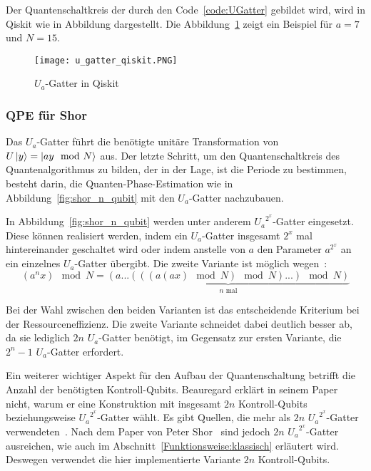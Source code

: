 Der Quantenschaltkreis der durch den Code~\ref{code:UGatter} gebildet wird, 
wird in Qiskit wie in Abbildung dargestellt. 
Die Abbildung~\ref{fig:u_gatter_qiskit} zeigt ein Beispiel für \(a=7\) und \(N=15\).

\begin{figure} [H]
  \caption{\(U_a\)-Gatter in Qiskit}
  \label{fig:u_gatter_qiskit}
  \texttt{[image: u\_gatter\_qiskit.PNG]}
  \centering
  \end{figure}

\subsubsection{QPE für Shor}
Das \(U_a\)-Gatter führt die benötigte unitäre Transformation von \(U\ket{y} = \ket{ay \mod N}\) aus.
Der letzte Schritt, um den Quantenschaltkreis des Quantenalgorithmus zu bilden, 
der in der Lage, ist die Periode zu bestimmen, 
besteht darin, 
die Quanten-Phase-Estimation wie in Abbildung~\ref{fig:shor_n_qubit} mit den \(U_a\)-Gatter nachzubauen.

In Abbildung~\ref{fig:shor_n_qubit} werden unter anderem \({U_a}^{2^x}\)-Gatter eingesetzt.
Diese können realisiert werden, 
indem ein \({U_a}\)-Gatter insgesamt \(2^x\) mal hintereinander geschaltet wird oder 
indem anstelle von \(a\) den Parameter \(a^{2^x}\) an ein einzelnes \(U_a\)-Gatter übergibt.
Die zweite Variante ist möglich wegen~\cite{beauregard2003circuit}:
\[(a^nx)\mod N = \underbrace{(a...(((a(ax)\mod N)\mod N)...)\mod N)}_{\text{\(n\) mal}}\]

Bei der Wahl zwischen den beiden Varianten ist das entscheidende Kriterium bei der Ressourceneffizienz. 
Die zweite Variante schneidet dabei deutlich besser ab, da sie lediglich \(2n\) \(U_a\)-Gatter benötigt, 
im Gegensatz zur ersten Variante, die \(2^n-1\) \(U_a\)-Gatter erfordert.

Ein weiterer wichtiger Aspekt für den Aufbau der Quantenschaltung betrifft die Anzahl der benötigten Kontroll-Qubits.
Beauregard erklärt in seinem Paper~\cite{beauregard2003circuit} nicht, 
warum er eine Konstruktion mit insgesamt \(2n\) Kontroll-Qubits beziehungsweise \({U_a}^{2^x}\)-Gatter wählt.
Es gibt Quellen, die mehr als \(2n\) \({U_a}^{2^x}\)-Gatter verwendeten~\cite{nielsen_chuang_2010}.
Nach dem Paper von Peter Shor~\cite{Shor_1997} sind jedoch \(2n\) \({U_a}^{2^x}\)-Gatter ausreichen,
wie auch im Abschnitt~\ref{Funktionsweise:klassisch} erläutert wird.
Deswegen verwendet die hier implementierte Variante \(2n\) Kontroll-Qubits.

